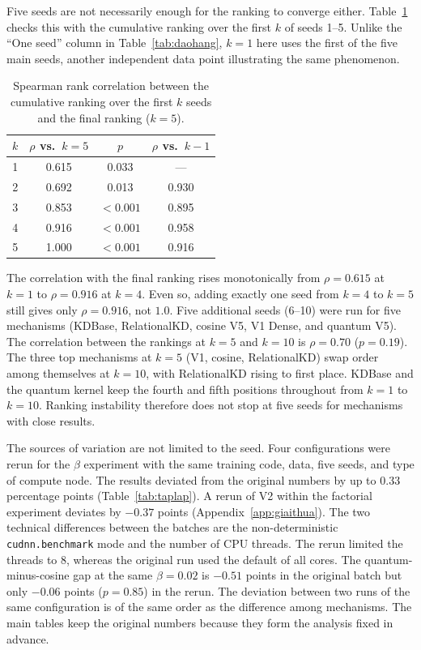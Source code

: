 Five seeds are not necessarily enough for the ranking to converge
either. Table~\ref{tab:hoitu} checks this with the cumulative ranking
over the first $k$ of seeds 1--5. Unlike the ``One seed'' column in
Table~\ref{tab:daohang}, $k=1$ here uses the first of the five main
seeds, another independent data point illustrating the same phenomenon.

\begin{table}[!htbp]
\centering
\caption{Spearman rank correlation between the cumulative ranking
over the first $k$ seeds and the final ranking ($k=5$).}
\label{tab:hoitu}
\begin{tabular}{cccc}
\toprule
$k$ & $\rho$ vs.\ $k=5$ & $p$ & $\rho$ vs.\ $k-1$ \\
\midrule
1 & 0.615 & 0.033 & --- \\
2 & 0.692 & 0.013 & 0.930 \\
3 & 0.853 & $<0.001$ & 0.895 \\
4 & 0.916 & $<0.001$ & 0.958 \\
5 & 1.000 & $<0.001$ & 0.916 \\
\bottomrule
\end{tabular}
\end{table}
\FloatBarrier

The correlation with the final ranking rises monotonically from
$\rho=0.615$ at $k=1$ to $\rho=0.916$ at $k=4$. Even so, adding exactly
one seed from $k=4$ to $k=5$ still gives only $\rho=0.916$, not $1.0$.
Five additional seeds (6--10) were run for five mechanisms (KDBase,
RelationalKD, cosine V5, V1 Dense, and quantum V5). The correlation
between the rankings at $k=5$ and $k=10$ is $\rho=0.70$ ($p=0.19$). The
three top mechanisms at $k=5$ (V1, cosine, RelationalKD) swap order
among themselves at $k=10$, with RelationalKD rising to first place.
KDBase and the quantum kernel keep the fourth and fifth positions
throughout from $k=1$ to $k=10$. Ranking instability therefore does not
stop at five seeds for mechanisms with close results.

The sources of variation are not limited to the seed. Four configurations were rerun for the $\beta$ experiment with the same
training code, data, five seeds, and type of compute node. The results
deviated from the original numbers by up to $0.33$ percentage points
(Table~\ref{tab:taplap}). A rerun of V2 within
the factorial experiment deviates by $-0.37$ points
(Appendix~\ref{app:giaithua}). The two technical
differences between the batches are the non-deterministic
\texttt{cudnn.benchmark} mode and the number of CPU threads. The rerun limited the threads to 8, whereas the
original run used the default of all cores. The
quantum-minus-cosine gap at the same $\beta = 0.02$ is $-0.51$ points
in the original batch but only $-0.06$ points ($p = 0.85$) in the rerun.
The deviation between two runs of the same configuration is of the same order as the difference among mechanisms. The main tables keep the
original numbers because they form the analysis fixed in advance.

